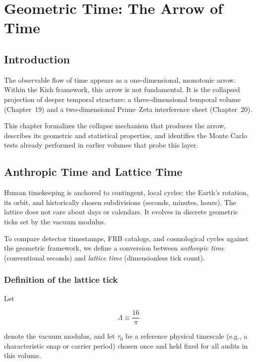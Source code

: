 \documentclass[11pt, letterpaper, openany]{book}
\begin{document}
\chapter{Geometric Time: The Arrow of Time}
\label{chap:arrow_of_time}

\section{Introduction}

The observable flow of time appears as a one-dimensional, monotonic arrow. 
Within the Kish framework, this arrow is not fundamental. 
It is the collapsed projection of deeper temporal structure: 
a three-dimensional temporal volume (Chapter~19) and a two-dimensional 
Prime--Zeta interference sheet (Chapter~20). 

This chapter formalizes the collapse mechanism that produces the arrow, 
describes its geometric and statistical properties, and identifies the 
Monte Carlo tests already performed in earlier volumes that probe this layer.

\section{Anthropic Time and Lattice Time}

Human timekeeping is anchored to contingent, local cycles: the Earth's rotation,
its orbit, and historically chosen subdivisions (seconds, minutes, hours). The
lattice does not care about days or calendars. It evolves in discrete geometric
ticks set by the vacuum modulus.

To compare detector timestamps, FRB catalogs, and cosmological cycles against the
geometric framework, we define a conversion between \emph{anthropic time}
(conventional seconds) and \emph{lattice time} (dimensionless tick count).

\subsection{Definition of the lattice tick}

Let


\[
\Lambda \equiv \frac{16}{\pi}
\]


denote the vacuum modulus, and let $\tau_0$ be a reference physical timescale
(e.g., a characteristic snap or carrier period) chosen once and held fixed for
all audits in this volume.
\end{document}
